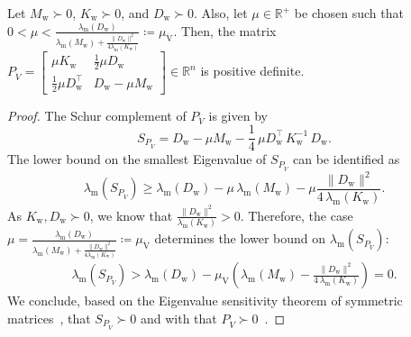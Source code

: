 \begin{lemma}\label{lemma:con:P_V_d_positive_definite}
    Let $M_\mathrm{w} \succ 0$, $K_\mathrm{w} \succ 0$, and $D_\mathrm{w} \succ 0$. Also, let $\mu \in \mathbb{R}^+$ be chosen such that $0 < \mu < \frac{\lambda_\mathrm{m}(D_\mathrm{w})}{\lambda_\mathrm{m}(M_\mathrm{w}) + \frac{\lVert D_\mathrm{w} \rVert^2}{4 \lambda_\mathrm{m} (K_\mathrm{w})}} \coloneqq \mu_{\dot{\mathrm{V}}}$.
    Then, the matrix $P_{\dot{V}} = \begin{bmatrix}
        \mu K_\mathrm{w} & \frac{1}{2} \mu D_\mathrm{w}\\
        \frac{1}{2} \mu D_\mathrm{w}^\top & D_\mathrm{w} - \mu M_\mathrm{w}
    \end{bmatrix} \in \mathbb{R}^{n}$ is positive definite.
\end{lemma}
\begin{proof}
    The Schur complement of $P_{\dot{V}}$ is given by
    \begin{equation}
        S_{P_{\dot{V}}} = D_\mathrm{w} - \mu M_\mathrm{w} - \frac{1}{4} \, \mu D_\mathrm{w}^\top \, K_\mathrm{w}^{-1} \, D_\mathrm{w}.
    \end{equation}
    The lower bound on the smallest Eigenvalue of $S_{P_{\dot{V}}}$ can be identified as
    \begin{equation}
        \lambda_\mathrm{m} \left (S_{P_{\dot{V}}} \right ) \geq \lambda_\mathrm{m}(D_\mathrm{w}) - \mu \, \lambda_\mathrm{m}(M_\mathrm{w}) - \mu \frac{\lVert D_\mathrm{w} \rVert^2}{4 \, \lambda_\mathrm{m}(K_\mathrm{w})}.
    \end{equation}
    As $K_\mathrm{w}, D_\mathrm{w} \succ 0$, we know that $\frac{\lVert D_\mathrm{w} \rVert^2}{\lambda_\mathrm{m}(K_\mathrm{w})} > 0$. Therefore, the case $\mu = \frac{\lambda_\mathrm{m}(D_\mathrm{w})}{\lambda_\mathrm{m}(M_\mathrm{w}) + \frac{\lVert D_\mathrm{w} \rVert^2}{4 \lambda_\mathrm{m} (K_\mathrm{w})}} \coloneqq \mu_{\dot{\mathrm{V}}}$ determines the lower bound on $\lambda_\mathrm{m}(S_{P_{\dot{V}}})$:
    \begin{equation}
    \begin{split}
        \lambda_\mathrm{m} \left (S_{P_{\dot{V}}} \right ) > \lambda_\mathrm{m}(D_\mathrm{w}) - \mu_{\dot{\mathrm{V}}} \left ( \lambda_\mathrm{m}(M_\mathrm{w}) - \frac{\lVert D_\mathrm{w} \rVert^2}{4 \, \lambda_\mathrm{m}(K_\mathrm{w})} \right ) = 0.
    \end{split}
    \end{equation}
    We conclude, based on the Eigenvalue sensitivity theorem of symmetric matrices~\citep{golub2013matrix}, that $S_{P_{\dot{V}}} \succ 0$ and with that $P_{\dot{V}} \succ 0$~\citep{boyd2004convex}.
\end{proof}

